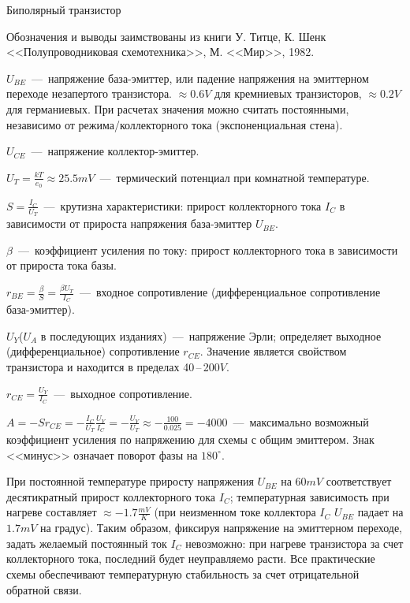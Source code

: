 \documentclass[
a4paper
,11pt
,landscape
,russian
,twocolumn
]{letter}
\newcommand\vsp{\vspace{.2in}}
\begin{document}
\thispagestyle{empty}

\begin{Large}
Биполярный транзистор
\end{Large}

Обозначения и выводы заимствованы из книги У. Титце, К. Шенк
<<Полупроводниковая схемотехника>>, М. <<Мир>>, 1982.

$U_{BE}$~---~напряжение база-эмиттер, или падение напряжения на
эмиттерном переходе незапертого транзистора. $\approx 0.6V$ для
кремниевых транзисторов, $\approx 0.2V$ для германиевых. При расчетах
значения можно считать постоянными, независимо от режима/коллекторного
тока (экспоненциальная стена).

$U_{CE}$~---~напряжение коллектор-эмиттер.

$U_T=\frac{kT}{e_0}\approx 25.5mV$~---~термический потенциал при
комнатной температуре.

$S=\frac{I_C}{U_T}$~---~крутизна характеристики: прирост коллекторного
тока $I_C$ в зависимости от прироста напряжения база-эмиттер $U_{BE}$.

$\beta$~---~коэффициент усиления по току: прирост
коллекторного тока в зависимости от прироста тока базы.

$r_{BE}=\frac{\beta}{S}=\frac{\beta U_T}{I_C}$~---~входное сопротивление
(дифференциальное сопротивление база-эмиттер).

$U_Y$($U_A$ в последующих изданиях)~---~напряжение Эрли; определяет
выходное (дифференциальное) сопротивление $r_{CE}$. Значение является
свойством транзистора и находится в пределах 40\,--\,200$V$.

$r_{CE}=\frac{U_Y}{I_C}$~---~выходное сопротивление.

$A=-Sr_{CE}=-\frac{I_C}{U_T}\frac{U_Y}{I_C}=-\frac{U_Y}{U_T}
\approx-\frac{100}{0.025}=-4000$~---~максимально возможный
коэффициент усиления по напряжению для схемы с общим эмиттером.
Знак <<минус>> означает поворот фазы на $180^{\circ}$.

\vsp

При постоянной температуре приросту напряжения $U_{BE}$ на $60mV$
соответствует десятикратный прирост коллекторного тока $I_C$;
температурная зависимость при нагреве составляет
$\approx -1.7\frac{mV}{K}$
(при неизменном токе коллектора $I_C$ $U_{BE}$ падает на
$1.7mV$ на градус). Таким образом, фиксируя напряжение на
эмиттерном переходе, задать желаемый постоянный ток $I_C$
невозможно: при нагреве транзистора за счет коллекторного
тока, последний будет неуправляемо расти. Все практические
схемы обеспечивают температурную стабильность за счет
отрицательной обратной связи.
\end{document}
